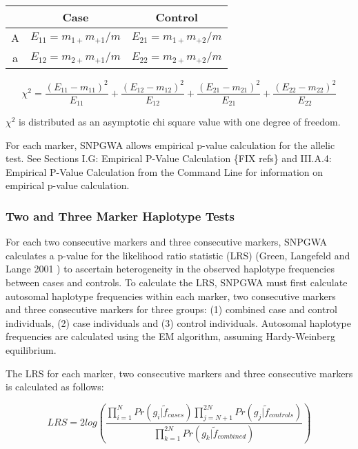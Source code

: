 \begin{center}
  \begin{tabular}{ccc}
    \hline
    {} & Case & Control \\
    \hline
    A  & $E_{11} = m_{1+}m_{+1}/m$ & $E_{21} = m_{1+}m_{+2}/m$ \\
    a  & $E_{12} = m_{2+}m_{+1}/m$ & $E_{22} = m_{2+}m_{+2}/m$ \\  
    \hline
  \end{tabular}
\end{center}


\begin{equation*}
  \chi^2 = \frac{\left(E_{11} - m_{11}\right)^2}{E_{11}} + \frac{\left(E_{12} - m_{12}\right)^2}{E_{12}} + \frac{\left(E_{21} - m_{21}\right)^2}{E_{21}} + \frac{\left(E_{22} - m_{22}\right)^2}{E_{22}}
\end{equation*}

$\chi^2$ is distributed as an asymptotic chi square value with one degree of
freedom.

For each marker, SNPGWA allows empirical p-value calculation for the allelic
test.  See Sections I.G: Empirical P-Value Calculation \{FIX refs\} and III.A.4:
Empirical P-Value Calculation from the Command Line for information on empirical
p-value calculation.


\subsubsection{Two and Three Marker Haplotype Tests}
For each two consecutive markers and three consecutive markers, SNPGWA
calculates a p-value for the likelihood ratio statistic (LRS) (Green, Langefeld
and Lange 2001 \cite{Green01}) to ascertain heterogeneity in the observed
haplotype frequencies between cases and controls.  To calculate the LRS, SNPGWA
must first calculate autosomal haplotype frequencies within each marker, two
consecutive markers and three consecutive markers for three groups: (1) combined
case and control individuals, (2) case individuals and (3) control individuals.
Autosomal haplotype frequencies are calculated using the EM algorithm, assuming
Hardy-Weinberg equilibrium.

The LRS for each marker, two consecutive markers and three consecutive markers
is calculated as follows:

\begin{equation*}
  LRS = 2log\left(\frac{\prod^N_{i=1}{Pr\left(g_i|\tilde{f}_{cases}\right)}\prod^{2N}_{j=N+1}Pr\left(g_j|\tilde{f}_{controls}\right)}{\prod^{2N}_{k=1}Pr\left(g_k|\tilde{f}_{combined}\right)}\right)
\end{equation*}

